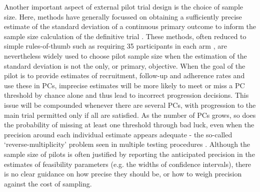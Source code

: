 \documentclass[AMA,STIX1COL]{WileyNJD-v2}
\begin{document}

Another important aspect of external pilot trial design is the choice of sample size. Here, methods have generally focussed on obtaining a sufficiently precise estimate of the standard deviation of a continuous primary outcome to inform the sample size calculation of the definitive trial \cite{Teare2014, Browne1995, Julious2005, Sim2012, Eldridge2015, Whitehead2015}. These methods, often reduced to simple rules-of-thumb such as requiring 35 participants in each arm \cite{Teare2014}, are nevertheless widely used to choose pilot sample size when the estimation of the standard deviation is not the only, or primary, objective. When the goal of the pilot is to provide estimates of recruitment, follow-up and adherence rates and use these in PCs, imprecise estimates will be more likely to meet or miss a PC threshold by chance alone \cite{Eldridge2015, Cooper2018} and thus lead to incorrect progression decisions. This issue will be compounded whenever there are several PCs, with progression to the main trial permitted only if all are satisfied. As the number of PCs grows, so does the probability of missing at least one threshold through bad luck, even when the precision around each individual estimate appears adequate - the so-called `reverse-multiplicity' problem seen in multiple testing procedures \cite{Senn2007, Chuang-Stein2007}. Although the sample size of pilots is often justified by reporting the anticipated precision in the estimates of feasibility parameters (e.g. the widths of confidence intervals), there is no clear guidance on how precise they should be, or how to weigh precision against the cost of sampling.


\end{document}
